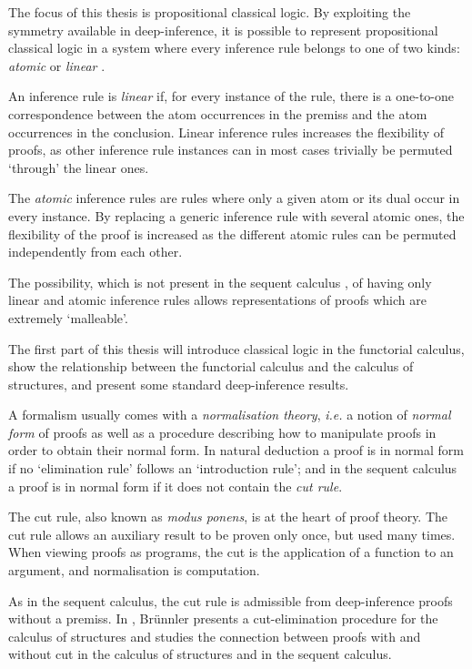The focus of this thesis is propositional classical logic. By exploiting the symmetry available in deep-inference, it is possible to represent propositional classical logic in a system where every inference rule belongs to one of two kinds: \emph{atomic} or \emph{linear} \cite{BrunTiu:01:A-Local-:mz}.

An inference rule is \emph{linear} if, for every instance of the rule, there is a one-to-one correspondence between the atom occurrences in the premiss and the atom occurrences in the conclusion. Linear inference rules increases the flexibility of proofs, as other inference rule instances can in most cases trivially be permuted `through' the linear ones.

The \emph{atomic} inference rules are rules where only a given atom or its dual occur in every instance. By replacing a generic inference rule with several atomic ones, the flexibility of the proof is increased as the different atomic rules can be permuted independently from each other.

The possibility, which is not present in the sequent calculus \cite{Brun:03:Two-Rest:mn}, of having only linear and atomic inference rules allows representations of proofs which are extremely `malleable'.

The first part of this thesis will introduce classical logic in the functorial calculus, show the relationship between the functorial calculus and the calculus of structures, and present some standard deep-inference results.

A formalism usually comes with a \emph{normalisation theory}, \emph{i.e.} a notion of \emph{normal form} of proofs as well as a procedure describing how to manipulate proofs in order to obtain their normal form. In natural deduction a proof is in normal form if no `elimination rule' follows an `introduction rule'; and in the sequent calculus a proof is in normal form if it does not contain the \emph{cut rule}.

The cut rule, also known as \emph{modus ponens}, is at the heart of proof theory. The cut rule allows an auxiliary result to be proven only once, but used many times. When viewing proofs as programs, the cut is the application of a function to an argument, and normalisation is computation.

As in the sequent calculus, the cut rule is admissible from deep-inference proofs without a premiss. In \cite{Brun:04:Deep-Inf:rq}, Br{\"u}nnler presents a cut-elimination procedure for the calculus of structures and studies the connection between proofs with and without cut in the calculus of structures and in the sequent calculus.

